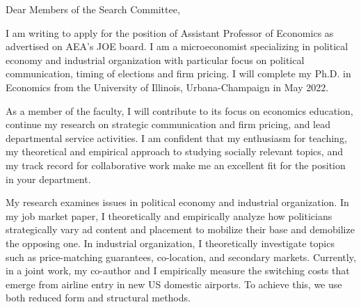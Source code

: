 \documentclass[12pt]{letter}
\begin{document}
\date{}
\begin{letter}{}

\opening{Dear Members of the Search Committee,}

I am writing to apply for the position of Assistant Professor of Economics as advertised on AEA's JOE board.
I am a microeconomist specializing in political economy and industrial organization with particular focus on political communication, timing of elections and firm pricing.
I will complete my Ph.D. in Economics from the University of Illinois, Urbana-Champaign in May 2022. 

As a member of the faculty, I will contribute to its focus on economics education,
continue my research on strategic communication and firm pricing, and lead departmental service activities.
%
I am confident that my enthusiasm for teaching, my theoretical and empirical approach to studying socially relevant topics, 
and my track record for collaborative work make me an excellent fit for the position in your department. 



My research examines issues in political economy and industrial organization.
In my job market paper, I theoretically and empirically analyze how politicians strategically vary ad content and placement to mobilize their base and demobilize the opposing one.
In industrial organization, I theoretically investigate topics such as price-matching guarantees, co-location, and secondary markets.
Currently, in a joint work, my co-author and I empirically measure the switching costs that emerge from airline entry in new US domestic airports.
To achieve this, we use both reduced form and structural methods.


\end{letter}
\end{document}
